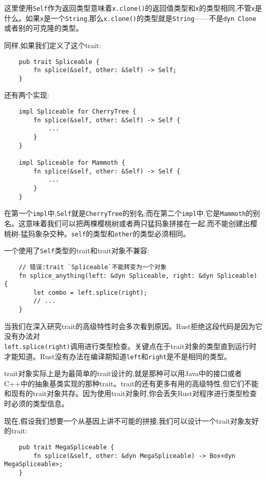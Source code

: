 这里使用\texttt{Self}作为返回类型意味着\texttt{x.clone()}的返回值类型和\texttt{x}的类型相同,不管\texttt{x}是什么。如果\texttt{x}是一个\texttt{String},那么\texttt{x.clone()}的类型就是\texttt{String}——不是\texttt{dyn Clone}或者别的可克隆的类型。

同样,如果我们定义了这个trait:
\begin{verbatim}
    pub trait Spliceable {
        fn splice(&self, other: &Self) -> Self;
    }
\end{verbatim}
还有两个实现:
\begin{verbatim}
    impl Spliceable for CherryTree {
        fn splice(&self, other: &Self) -> Self {
            ...
        }
    }

    impl Spliceable for Mammoth {
        fn splice(&self, other: &Self) -> Self {
            ...
        }
    }    
\end{verbatim}

在第一个\texttt{impl}中,\texttt{Self}就是\texttt{CherryTree}的别名;而在第二个\texttt{impl}中,它是\texttt{Mammoth}的别名。这意味着我们可以把两棵樱桃树或者两只猛犸象拼接在一起,而不能创建出樱桃树-猛犸象杂交种。\texttt{self}的类型和\texttt{other}的类型必须相同。

一个使用了\texttt{Self}类型的trait和trait对象不兼容:
\begin{verbatim}
    // 错误:trait `Spliceable`不能转变为一个对象
    fn splice_anything(left: &dyn Spliceable, right: &dyn Spliceable) {
        let combo = left.splice(right);
        // ...
    }
\end{verbatim}

当我们在深入研究trait的高级特性时会多次看到原因。Rust拒绝这段代码是因为它没有办法对\\
\texttt{left.splice(right)}调用进行类型检查。关键点在于trait对象的类型直到运行时才能知道。Rust没有办法在编译期知道\texttt{left}和\texttt{right}是不是相同的类型。

trait对象实际上是为最简单的trait设计的,就是那种可以用Java中的接口或者C++中的抽象基类实现的那种trait。trait的还有更多有用的高级特性,但它们不能和现有的trait对象共存。因为使用trait对象时,你会丢失Rust对程序进行类型检查时必须的类型信息。

现在,假设我们想要一个从基因上讲不可能的拼接,我们可以设计一个trait对象友好的trait:
\begin{verbatim}
    pub trait MegaSpliceable {
        fn splice(&self, other: &dyn MegaSpliceable) -> Box<dyn MegaSpliceable>;
    }
\end{verbatim}

